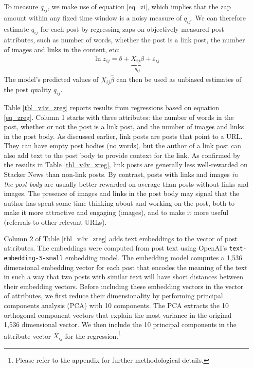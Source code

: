 To measure $q_{ij}$, we make use of equation \eqref{eq_zi}, which implies that the zap amount within any fixed time window is a noisy measure of $q_{ij}$. We can therefore estimate $q_{ij}$ for each post by regressing zaps on objectively measured post attributes, such as number of words, whether the post is a link post, the number of images and links in the content, etc:
\begin{align}
\ln z_{ij} = \theta + \underbrace{X_{ij}\beta}_{q_{ij}}+\varepsilon_{ij} \label{eq_zreg}
\end{align}
The model's predicted values of $X_{ij} \hat{\beta}$ can then be used as unbiased estimates of the post quality $q_{ij}$. 

Table \ref{tbl_v4v_zreg} reports results from regressions based on equation \eqref{eq_zreg}. Column 1 starts with three attributes: the number of words in the post, whether or not the post is a link post, and the number of images and links in the post body. As discussed earlier, link posts are posts that point to a URL. They can have empty post bodies (no words), but the author of a link post can also add text to the post body to provide context for the link. As confirmed by the results in Table \ref{tbl_v4v_zreg}, link posts are generally less well-rewarded on Stacker News than non-link posts. By contrast, posts with links and images \emph{in the post body} are usually better rewarded on average than posts without links and images. The presence of images and links in the post body may signal that the author has spent some time thinking about and working on the post, both to make it more attractive and engaging (images), and to make it more useful (referrals to other relevant URLs). 

Column 2 of Table \ref{tbl_v4v_zreg} adds text embeddings to the vector of post attributes. The embeddings were computed from post text using OpenAI's \texttt{text-embedding-3-small} embedding model. The embedding model computes a 1,536 dimensional embedding vector for each post that encodes the meaning of the text in such a way that two posts with similar text will have short distances between their embedding vectors. Before including these embedding vectors in the vector of attributes, we first reduce their dimensionality by performing principal components analysis (PCA) with 10 components. The PCA extracts the 10 orthogonal component vectors that explain the most variance in the original 1,536 dimensional vector. We then include the 10 principal components in the attribute vector $X_{ij}$ for the regression.\footnote{Please refer to the appendix for further methodological details.} 

